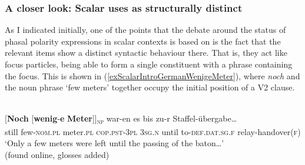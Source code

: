\subsubsection{A closer look: Scalar uses as structurally distinct}\largerpage
As I indicated initially, one of the points that the debate around the status of phasal polarity expressions in scalar contexts is based on is the  fact that the relevant  items show a distinct syntactic behaviour there. That is, they act like focus particles, being able to form a single constituent with a phrase containing the focus. This is shown in (\ref{exScalarIntroGermanWenigeMeter}), where \textit{noch} and the noun phrase \lq few meters\rq{} together occupy the initial position of a V2 clause.

\begin{exe}
		 \\
\gll \textup{[}\textbf{Noch} \textup{[}\textbf{wenig}-\textbf{e} \textbf{Meter}\textup{]]\textsubscript{\textsc{np}}} war-en es bis zu-r Staffel-übergabe…\\
	\phantom{[}still \phantom{[}few-\textsc{nom}.\textsc{pl} meter.\textsc{pl} \textsc{cop}.\textsc{pst}-3\textsc{pl} 3\textsc{sg}.\textsc{n} until to-\textsc{def}.\textsc{dat}.\textsc{sg}.\textsc{f} relay-handover(\textsc{f})\\
	\glt \lq Only a few meters were left until the passing of the baton…\rq
	\\(found online, glosses added)
\end{exe} 

